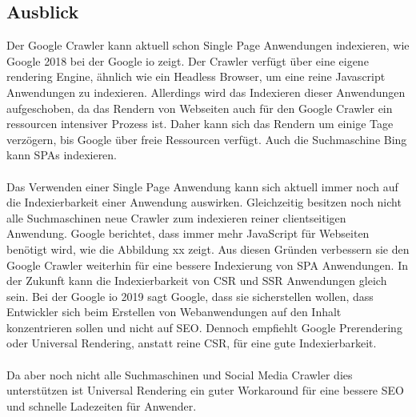 \documentclass[runningheads]{llncs}
\begin{document}
\subsection{Ausblick}
\label{subsec:Ausblick}
Der Google Crawler kann aktuell schon Single Page Anwendungen indexieren, 
wie Google 2018 bei der Google io zeigt. 
Der Crawler verfügt über eine eigene rendering Engine, 
ähnlich wie ein Headless Browser, 
um eine reine Javascript Anwendungen zu indexieren. 
Allerdings wird das Indexieren dieser Anwendungen aufgeschoben, 
da das Rendern von Webseiten auch für den Google Crawler 
ein ressourcen intensiver Prozess ist. 
Daher kann sich das Rendern um einige Tage verzögern, 
bis Google über freie Ressourcen verfügt. 
Auch die Suchmaschine Bing kann SPAs indexieren.
\\
\\
Das Verwenden einer Single Page Anwendung 
kann sich aktuell immer noch auf die Indexierbarkeit einer Anwendung auswirken. 
Gleichzeitig besitzen noch nicht alle Suchmaschinen neue Crawler 
zum indexieren reiner clientseitigen Anwendung. 
Google berichtet, dass immer mehr JavaScript für Webseiten benötigt wird, 
wie die Abbildung xx zeigt. 
Aus diesen Gründen verbessern sie den Google Crawler weiterhin für eine bessere Indexierung von SPA Anwendungen. 
In der Zukunft kann die Indexierbarkeit von CSR und SSR Anwendungen gleich sein. 
Bei der Google io 2019 sagt Google, 
dass sie sicherstellen wollen, 
dass Entwickler sich beim Erstellen von Webanwendungen auf den Inhalt konzentrieren sollen und nicht auf SEO. 
Dennoch empfiehlt Google Prerendering oder Universal Rendering, 
anstatt reine CSR, für eine gute Indexierbarkeit.
\\
\\
Da aber noch nicht alle Suchmaschinen und 
Social Media Crawler dies unterstützen ist Universal Rendering ein 
guter Workaround für eine bessere SEO und schnelle Ladezeiten für Anwender.



\newpage
%


\end{document}
